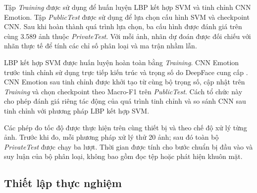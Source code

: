 \documentclass[../LuanVan.tex]{subfiles}
\begin{document}
\begin{table}[H]
    \centering
    \caption{Phân bố ảnh theo lớp trong FER-2013}
    \label{tab:fer2013_distribution_ch5}
\end{table}

Tập \textit{Training} được sử dụng để huấn luyện LBP kết hợp SVM và tinh chỉnh CNN Emotion. Tập \textit{PublicTest} được sử dụng để lựa chọn cấu hình SVM và checkpoint CNN. Sau khi hoàn thành quá trình lựa chọn, ba cấu hình được đánh giá trên cùng 3.589 ảnh thuộc \textit{PrivateTest}. Với mỗi ảnh, nhãn dự đoán được đối chiếu với nhãn thực tế để tính các chỉ số phân loại và ma trận nhầm lẫn.

LBP kết hợp SVM được huấn luyện hoàn toàn bằng \textit{Training}. CNN Emotion trước tinh chỉnh sử dụng trực tiếp kiến trúc và trọng số do DeepFace cung cấp \cite{serengil2021hyperextended,deepfaceEmotionModel}. CNN Emotion sau tinh chỉnh được khởi tạo từ cùng bộ trọng số, cập nhật trên \textit{Training} và chọn checkpoint theo Macro-F1 trên \textit{PublicTest}. Cách tổ chức này cho phép đánh giá riêng tác động của quá trình tinh chỉnh và so sánh CNN sau tinh chỉnh với phương pháp LBP kết hợp SVM.

Các phép đo tốc độ được thực hiện trên cùng thiết bị và theo chế độ xử lý từng ảnh. Trước khi đo, mỗi phương pháp xử lý thử 20 ảnh; sau đó toàn bộ \textit{PrivateTest} được chạy ba lượt. Thời gian được tính cho bước chuẩn bị đầu vào và suy luận của bộ phân loại, không bao gồm đọc tệp hoặc phát hiện khuôn mặt.

\subsection{Thiết lập thực nghiệm}
\label{subsection:5.2.3}
\end{document}

